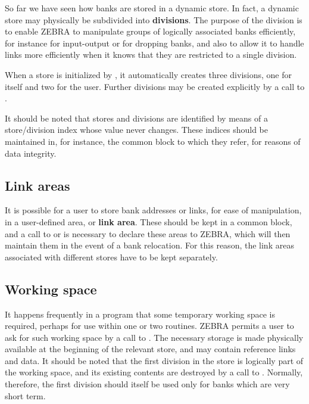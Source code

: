 So far we have seen how banks are stored in a dynamic
store. In fact, a dynamic store may physically be subdivided into
{\bf divisions}. The purpose of the division is to enable ZEBRA to
manipulate groups of logically associated banks efficiently, for instance
for input-output or for dropping banks, and also to allow it to handle links
more efficiently when it knows that they are restricted to a single
division.

When a store is initialized by , it automatically creates three
divisions, one for itself and two for the user. Further divisions may be
created explicitly by a call to .

It should be noted that stores and divisions are identified by
means of a store/division index whose value never changes. These indices
should be maintained in, for instance, the common block to which they
refer, for reasons of
data integrity.

\subsection{Link areas}

It is possible for a user to store bank addresses or links, for ease
of manipulation, in a user-defined area, or {\bf link area}.
These should be kept in a common block, and a call to
 or  is necessary to declare these areas to ZEBRA, which
will then maintain them in the event of a bank relocation. For this
reason, the link areas associated with different stores have to be kept
separately.

\subsection{Working space}

It happens frequently in a program that some temporary working space is
required, perhaps for use within one or two routines. 
ZEBRA permits a user to ask for such working space by a call to . 
The necessary
storage is made physically available at the beginning of the relevant
store, and may contain reference links and data. It should be noted that
the first division in the store is logically part of the working space,
and its existing contents are destroyed by a call to . 
Normally, therefore, the first division should itself be used only for 
banks which are very short term.

\newpage
{}
